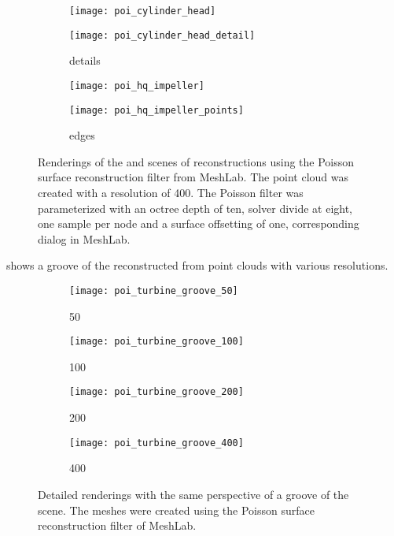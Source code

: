 \begin{figure}
	\centering
	\begin{subfigure}[b]{0.49\textwidth}
		\centering
		\texttt{[image: poi\_cylinder\_head]}
		\caption{\cylinderhead}
		\label{fig:poi_cylinder_head}
	\end{subfigure}
	\begin{subfigure}[b]{0.49\textwidth}
		\centering
		\texttt{[image: poi\_cylinder\_head\_detail]}
		\caption{\cylinderhead details}
		\label{fig:poi_cylinder_head_detail}
	\end{subfigure}
	\begin{subfigure}[b]{0.49\textwidth}
		\centering
		\texttt{[image: poi\_hq\_impeller]}
		\caption{\impeller}
		\label{fig:poi_hq_impeller}
	\end{subfigure}
	\begin{subfigure}[b]{0.49\textwidth}
		\centering
		\texttt{[image: poi\_hq\_impeller\_points]}
		\caption{\impeller edges}
		\label{fig:poi_hq_impeller_points}
	\end{subfigure}
	\caption{
		Renderings of the \cylinderhead and \impeller scenes of reconstructions using the Poisson surface reconstruction filter from MeshLab.
		The point cloud was created with a resolution of 400.
		The Poisson filter was parameterized with an octree depth of ten, solver divide at eight, one sample per node and a surface offsetting of one, \cf corresponding dialog in MeshLab.
	}
	\label{fig:poisson_results}
\end{figure}

 shows a groove of the \turbine reconstructed from point clouds with various resolutions.

\begin{figure}
	\begin{subfigure}[b]{0.24\textwidth}
		\centering
		\texttt{[image: poi\_turbine\_groove\_50]}
		\caption{50}
		\label{fig:poi_turbine_groove_50}
	\end{subfigure}
	\begin{subfigure}[b]{0.24\textwidth}
		\centering
		\texttt{[image: poi\_turbine\_groove\_100]}
		\caption{100}
		\label{fig:poi_turbine_groove_100}
	\end{subfigure}
	\begin{subfigure}[b]{0.24\textwidth}
		\centering
		\texttt{[image: poi\_turbine\_groove\_200]}
		\caption{200}
		\label{fig:poi_turbine_groove_200}
	\end{subfigure}
	\begin{subfigure}[b]{0.24\textwidth}
		\centering
		\texttt{[image: poi\_turbine\_groove\_400]}
		\caption{400}
		\label{fig:poi_turbine_groove_400}
	\end{subfigure}
	\caption{
		Detailed renderings with the same perspective of a groove of the \turbine scene.
		The meshes were created using the Poisson surface reconstruction filter of MeshLab.
	}
	\label{fig:poi_grooves}
\end{figure}

\endgroup
